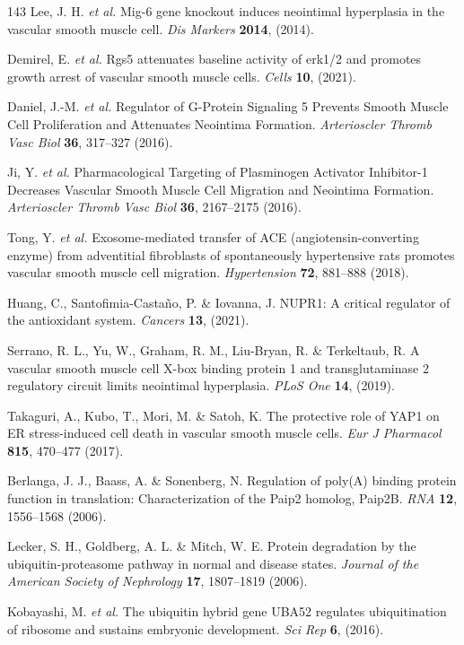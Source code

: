 \documentclass[12pt]{article}
\begin{document}
\begin{thebibliography}{143}
 Lee, J. H. \textit{et al.} Mig-6 gene knockout induces neointimal hyperplasia in the vascular smooth muscle cell. \textit{Dis Markers} \textbf{2014}, (2014).

 Demirel, E. \textit{et al.} Rgs5 attenuates baseline activity of erk1/2 and promotes growth arrest of vascular smooth muscle cells. \textit{Cells} \textbf{10}, (2021).

 Daniel, J.-M. \textit{et al.} Regulator of G-Protein Signaling 5 Prevents Smooth Muscle Cell Proliferation and Attenuates Neointima Formation. \textit{Arterioscler Thromb Vasc Biol} \textbf{36}, 317--327 (2016).

 Ji, Y. \textit{et al.} Pharmacological Targeting of Plasminogen Activator Inhibitor-1 Decreases Vascular Smooth Muscle Cell Migration and Neointima Formation. \textit{Arterioscler Thromb Vasc Biol} \textbf{36}, 2167--2175 (2016).

 Tong, Y. \textit{et al.} Exosome-mediated transfer of ACE (angiotensin-converting enzyme) from adventitial fibroblasts of spontaneously hypertensive rats promotes vascular smooth muscle cell migration. \textit{Hypertension} \textbf{72}, 881--888 (2018).

 Huang, C., Santofimia-Castaño, P. \& Iovanna, J. NUPR1: A critical regulator of the antioxidant system. \textit{Cancers} \textbf{13}, (2021).

 Serrano, R. L., Yu, W., Graham, R. M., Liu-Bryan, R. \& Terkeltaub, R. A vascular smooth muscle cell X-box binding protein 1 and transglutaminase 2 regulatory circuit limits neointimal hyperplasia. \textit{PLoS One} \textbf{14}, (2019).

 Takaguri, A., Kubo, T., Mori, M. \& Satoh, K. The protective role of YAP1 on ER stress-induced cell death in vascular smooth muscle cells. \textit{Eur J Pharmacol} \textbf{815}, 470--477 (2017).

 Berlanga, J. J., Baass, A. \& Sonenberg, N. Regulation of poly(A) binding protein function in translation: Characterization of the Paip2 homolog, Paip2B. \textit{RNA} \textbf{12}, 1556--1568 (2006).

 Lecker, S. H., Goldberg, A. L. \& Mitch, W. E. Protein degradation by the ubiquitin-proteasome pathway in normal and disease states. \textit{Journal of the American Society of Nephrology} \textbf{17}, 1807--1819 (2006).

 Kobayashi, M. \textit{et al.} The ubiquitin hybrid gene UBA52 regulates ubiquitination of ribosome and sustains embryonic development. \textit{Sci Rep} \textbf{6}, (2016).


\end{thebibliography}
\end{document}
